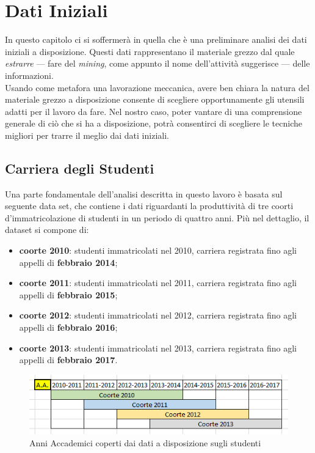 \chapter{Dati Iniziali}
\label{ch:rawd}

In questo capitolo ci si soffermerà in quella che è una preliminare analisi dei dati iniziali a disposizione. Questi dati rappresentano il materiale grezzo dal quale \textit{estrarre} --- fare del \textit{mining}, come appunto il nome dell'attività suggerisce --- delle informazioni. \\

Usando come metafora una lavorazione meccanica, avere ben chiara la natura del materiale grezzo a disposizione consente di scegliere opportunamente gli utensili adatti per il lavoro da fare. Nel nostro caso, poter vantare di una comprensione generale di ciò che si ha a disposizione, potrà consentirci di scegliere le tecniche migliori per trarre il meglio dai dati iniziali. \\

\section{Carriera degli Studenti}

Una parte fondamentale dell'analisi descritta in questo lavoro è basata sul seguente data set, che contiene i dati riguardanti la produttività di tre coorti d'immatricolazione di studenti in un periodo di quattro anni. Più nel dettaglio, il dataset si compone di:

\begin{itemize}
	\item \textbf{coorte 2010}: studenti immatricolati nel 2010, carriera registrata fino agli appelli di \textbf{febbraio 2014};
	\item \textbf{coorte 2011}: studenti immatricolati nel 2011, carriera registrata fino agli appelli di \textbf{febbraio 2015};
	\item \textbf{coorte 2012}: studenti immatricolati nel 2012, carriera registrata fino agli appelli di \textbf{febbraio 2016};
	\item \textbf{coorte 2013}: studenti immatricolati nel 2013, carriera registrata fino agli appelli di \textbf{febbraio 2017}.
\end{itemize}

\begin{figure}
    \centering
    \caption{Anni Accademici coperti dai dati a disposizione sugli studenti}
    \label{1_a}
	\includegraphics[scale=0.75]{../raw/stud_comp.png}
\end{figure}


